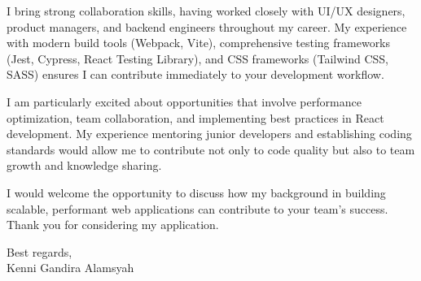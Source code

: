 \documentclass[12pt]{article}
\begin{document}
\vspace{0.3cm}

I bring strong collaboration skills, having worked closely with UI/UX designers, product managers, and backend engineers throughout my career. My experience with modern build tools (Webpack, Vite), comprehensive testing frameworks (Jest, Cypress, React Testing Library), and CSS frameworks (Tailwind CSS, SASS) ensures I can contribute immediately to your development workflow.

\vspace{0.3cm}

I am particularly excited about opportunities that involve performance optimization, team collaboration, and implementing best practices in React development. My experience mentoring junior developers and establishing coding standards would allow me to contribute not only to code quality but also to team growth and knowledge sharing.

\vspace{0.3cm}

I would welcome the opportunity to discuss how my background in building scalable, performant web applications can contribute to your team's success. Thank you for considering my application.

\vspace{0.5cm}

Best regards,\\
Kenni Gandira Alamsyah
\end{document}
